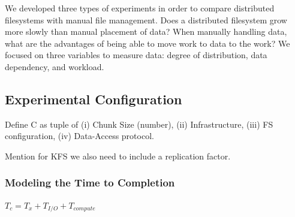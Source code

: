 \documentclass{rspublic}
\begin{document}
We developed three types of experiments in order to compare
distributed filesystems with manual file management.  Does a
distributed filesystem grow more slowly than manual placement of data?
When manually handling data, what are the advantages of being able to
move work to data to the work?  We focused on three variables to
measure data: degree of distribution, data dependency, and workload.

\subsection{Experimental Configuration}

Define C as  tuple of (i) Chunk Size (number), (ii) Infrastructure,
(iii) FS configuration, (iv) Data-Access protocol.

Mention for KFS we also need to include a replication factor.

\subsubsection{Modeling the Time to Completion}

$T_c = T_x + T_{I/O} + T_{compute}$
\end{document}
